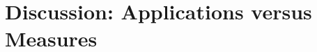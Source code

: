 \documentclass[12pt]{article}
\begin{document}


\section{Discussion: Applications versus Measures}\label{sec:discussion}
\end{document}
